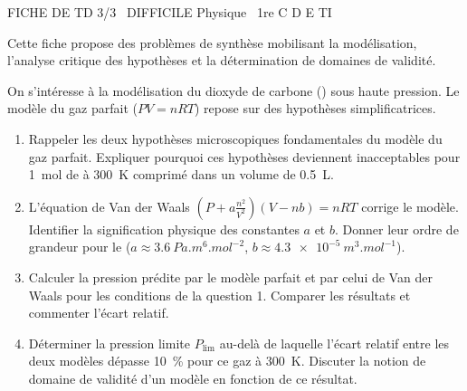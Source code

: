 \documentclass[11pt]{article}
\begin{document}
\begin{tcolorbox}[enhanced,colback=popink,colframe=popink,arc=10pt,boxrule=0pt,left=12pt,right=12pt,top=9pt,bottom=9pt]
{\color{white}\popxbold\small FICHE DE TD 3/3 \textbullet\ DIFFICILE \hfill Physique \textbullet\ 1re C D E TI\par}
\end{tcolorbox}
\vspace{4pt}
Cette fiche propose des problèmes de synthèse mobilisant la modélisation, l'analyse critique des hypothèses et la détermination de domaines de validité.

\begin{exercice}
On s'intéresse à la modélisation du dioxyde de carbone () sous haute pression. Le modèle du gaz parfait ($PV=nRT$) repose sur des hypothèses simplificatrices.
\begin{enumerate}
    \item Rappeler les deux hypothèses microscopiques fondamentales du modèle du gaz parfait. Expliquer pourquoi ces hypothèses deviennent inacceptables pour \SI{1}{mol} de  à \SI{300}{K} comprimé dans un volume de \SI{0,5}{L}.
    \item L'équation de Van der Waals $\left(P + a\frac{n^2}{V^2}\right)(V-nb)=nRT$ corrige le modèle. Identifier la signification physique des constantes $a$ et $b$. Donner leur ordre de grandeur pour le  ($a \approx \SI{3,6}{Pa.m^6.mol^{-2}}$, $b \approx \SI{4,3e-5}{m^3.mol^{-1}}$).
    \item Calculer la pression prédite par le modèle parfait et par celui de Van der Waals pour les conditions de la question 1. Comparer les résultats et commenter l'écart relatif.
    \item Déterminer la pression limite $P_{\text{lim}}$ au-delà de laquelle l'écart relatif entre les deux modèles dépasse \SI{10}{\%} pour ce gaz à \SI{300}{K}. Discuter la notion de domaine de validité d'un modèle en fonction de ce résultat.
\end{enumerate}
\end{exercice}
\end{document}
